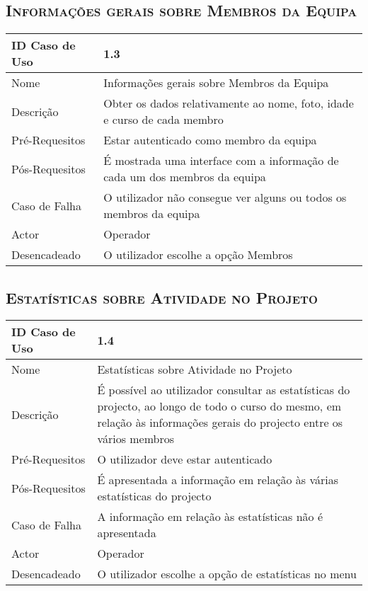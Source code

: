 \documentclass[12pt]{article}
\begin{document}
\subsection{ \textsc{Informações gerais sobre Membros da Equipa}}

\begin{center}
\begin{tabular}{ | m{4cm} | m{10cm} | } 
\hline
ID Caso de Uso & 1.3\\
\hline
Nome & Informações gerais sobre Membros da Equipa\\
\hline
Descrição & Obter os dados relativamente ao nome, foto, idade
 e curso de cada membro \\
\hline
Pré-Requesitos & Estar autenticado como membro da equipa\\
\hline
Pós-Requesitos & É mostrada uma interface com a informação de
 cada um dos membros da equipa\\
\hline
Caso de Falha & O utilizador não consegue ver alguns ou
 todos os membros da equipa\\
\hline
Actor & Operador\\
\hline
Desencadeado & O utilizador escolhe a opção Membros \\
\hline
\end{tabular}
\end{center}


\subsection{ \textsc{Estatísticas sobre Atividade no Projeto}}

\begin{center}
\begin{tabular}{ | m{4cm} | m{10cm} | } 
\hline
ID Caso de Uso & 1.4\\
\hline
Nome & Estatísticas sobre Atividade no Projeto\\
\hline
Descrição & 
É possível ao utilizador consultar as estatísticas do projecto, ao longo de todo o curso do mesmo, em relação às informações gerais do projecto entre os vários membros
\\
\hline
Pré-Requesitos & O utilizador deve estar autenticado\\
\hline
Pós-Requesitos & É apresentada a informação em relação às várias estatísticas do projecto \\
\hline
Caso de Falha & A informação em relação às estatísticas não é apresentada\\
\hline
Actor & Operador\\
\hline
Desencadeado & O utilizador escolhe a opção de estatísticas no menu\\
\hline
\end{tabular}
\end{center}
\end{document}
